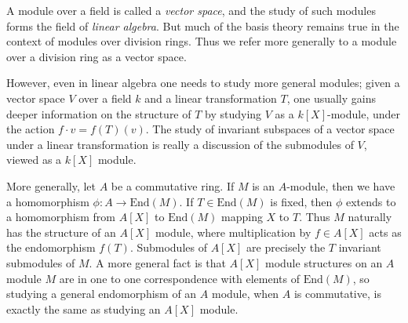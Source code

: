 \begin{example}
    A module over a field is called a \emph{vector space}, and the study of such modules forms the field of \emph{linear algebra}. But much of the basis theory remains true in the context of modules over division rings. Thus we refer more generally to a module over a division ring as a vector space.

    However, even in linear algebra one needs to study more general modules; given a vector space $V$ over a field $k$ and a linear transformation $T$, one usually gains deeper information on the structure of $T$ by studying $V$ as a $k[X]$-module, under the action $f \cdot v = f(T) (v)$. The study of invariant subspaces of a vector space under a linear transformation is really a discussion of the submodules of $V$, viewed as a $k[X]$ module.

    More generally, let $A$ be a commutative ring. If $M$ is an $A$-module, then we have a homomorphism $\phi: A \to \text{End}(M)$. If $T \in \text{End}(M)$ is fixed, then $\phi$ extends to a homomorphism from $A[X]$ to $\text{End}(M)$ mapping $X$ to $T$. Thus $M$ naturally has the structure of an $A[X]$ module, where multiplication by $f \in A[X]$ acts as the endomorphism $f(T)$. Submodules of $A[X]$ are precisely the $T$ invariant submodules of $M$. A more general fact is that $A[X]$ module structures on an $A$ module $M$ are in one to one correspondence with elements of $\text{End}(M)$, so studying a general endomorphism of an $A$ module, when $A$ is commutative, is exactly the same as studying an $A[X]$ module. 
\end{example}


